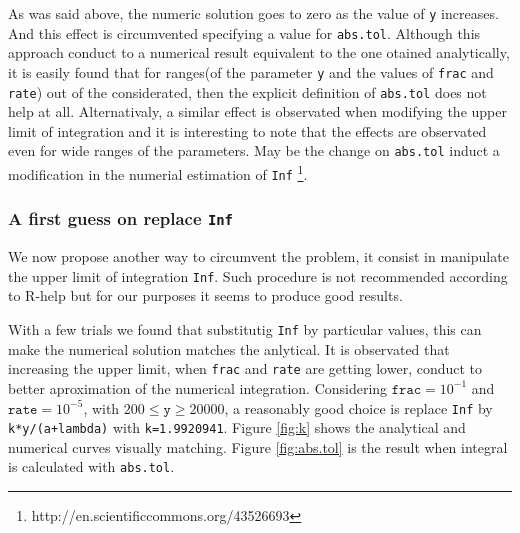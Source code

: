 \documentclass{article}
\newcommand{\code}[1]{\texttt{#1}}
\begin{document}
As was said above, the numeric solution goes to zero as the value of \code{y} increases. And this effect is circumvented specifying a value 
for \code{abs.tol}. Although this approach conduct to a numerical result equivalent to the one otained analytically, it is easily found that for ranges(of the parameter  \code{y} and the values of \code{frac} and \code{rate}) out of the considerated, then the explicit definition of \code{abs.tol} does not help at all. Alternativaly, a similar effect is observated when modifying the upper limit of integration and it is interesting to note that the effects are observated even for wide ranges of the parameters. May be the change on \code{abs.tol} induct a modification in the numerial estimation of \code{Inf}  \footnote{http://en.scientificcommons.org/43526693}.

\subsubsection*{A first guess on replace \code{Inf}}

We now propose another way to circumvent the problem, it consist in manipulate the upper limit of integration \code{Inf}. Such procedure is not recommended according to R-help but for our purposes it seems to produce good results.

With a few trials we found that substitutig \code{Inf} by particular values, this can make the numerical solution matches the anlytical. It is observated that increasing the upper limit, when \code{frac} and \code{rate} are getting lower,  conduct to better aproximation of the numerical integration. Considering $\code{frac}=10^{-1}$ and $\code{rate}=10^{-5}$, with $200 \leq \code{y} \geq 20000$, a reasonably good choice is replace \code{Inf} by \code{k*y/(a+lambda)} with \code{k=1.9920941}. Figure \ref{fig:k} shows the analytical and numerical curves visually matching. Figure \ref{fig:abs.tol} is the result when integral is calculated with \code{abs.tol}.
\end{document}
